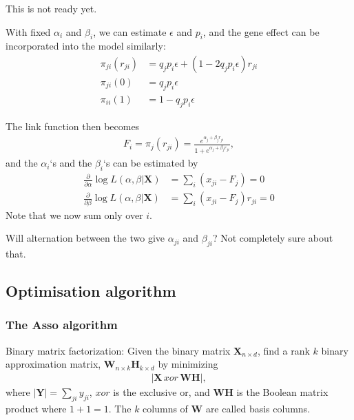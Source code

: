\documentclass[12pt]{article}
\begin{document}
This is not ready yet. 


 {\color{gray} 
With fixed $\alpha_{i}$ and $\beta_{i}$, we can estimate $\epsilon$ and $p_i$, and the gene effect can be incorporated into the model similarly: 
\begin{align}
 \pi_{ji}(r_{ji}) &= q_j p_i \epsilon + (1 - 2 q_j  p_i \epsilon) r_{ji} \\
  \pi_{ji}(0)& = q_j p_i  \epsilon \nonumber \\
  \pi_{ii}(1)& = 1 - q_j p_i  \epsilon \nonumber
\end{align}

The link function then becomes
\begin{align} \label{eq:LinkGene}
  F_i = \pi_j(r_{ji}) = \frac{e^{\alpha_j + \beta_j r_{ji}}}{1 + e^{\alpha_j + \beta_j r_{ji}}},
\end{align}
and the $\alpha_i$`s and the $\beta_i$`s can be estimated by
\begin{align} \label{eq:jAlphaBeta}
  \frac{\partial}{\partial \alpha} \log L(\alpha, \beta|\mathbf{X}) &= \sum_{i} (x_{ji} - F_{j}) = 0 \\
  \frac{\partial}{\partial \beta} \log L(\alpha, \beta|\mathbf{X}) &= \sum_{i} (x_{ji} - F_{j})r_{ji} = 0 \nonumber
\end{align}
Note that we now sum only over $i$. 

Will alternation between the two give $\alpha_{ji}$ and $\beta_{ji}$? Not completely sure about that.}

\subsection{Optimisation algorithm} %

\subsubsection*{The Asso algorithm} %

Binary matrix factorization: Given the binary matrix $\mathbf{X}_{n \times d}$, find a  rank $k$ binary approximation matrix, $\mathbf{W}_{n \times k} \mathbf{H}_{k \times d}$ by minimizing 
\begin{align}
  |\mathbf{X}\, xor\, \mathbf{W} \mathbf{H}|,
\end{align}
where $|\mathbf{Y}| = \sum_{j i} y_{ji}$, $xor$ is the exclusive or, and $\mathbf{WH}$ is the Boolean matrix product where $1+1 = 1$.
The $k$ columns of $\mathbf{W}$ are called basis columns. 
\end{document}
